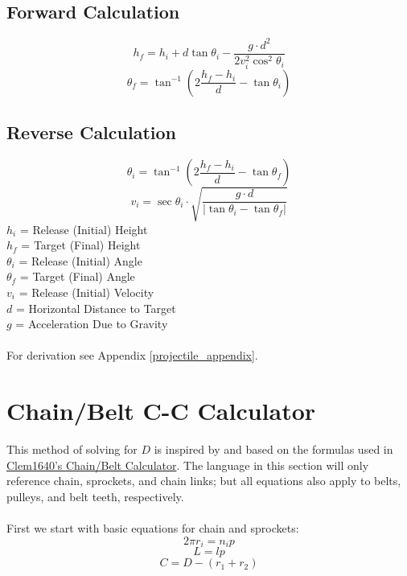 \documentclass[11pt,a4paper,titlepage]{article}
\begin{document}
	\subsection{Forward Calculation}
	\begin{equation} \label{proj_final_height}
		h_f = h_i + d \tan \theta_i - \frac{g \cdot d^2}{2 v_i^2 \cos^2 \theta_i}
	\end{equation}
	\begin{equation} \label{proj_final_angle}
		\theta_f = \tan^{-1} \left( 2 \frac{h_f - h_i}{d} - \tan \theta_i \right)
	\end{equation}
	
	\subsection{Reverse Calculation}
	\begin{equation} \label{proj_init_angle}
		\theta_i = \tan^{-1} \left( 2 \frac{h_f - h_i}{d} - \tan \theta_f \right)
	\end{equation}
	\begin{equation} \label{proj_init_vel}
		v_i = \sec \theta_i \cdot \sqrt{\frac{g \cdot d}{\left| \tan \theta_i - \tan \theta_f \right|}}
	\end{equation}
	$h_i$ = Release (Initial) Height \\
	$h_f$ = Target (Final) Height \\
	$\theta_i$ = Release (Initial) Angle \\
	$\theta_f$ = Target (Final) Angle \\
	$v_i$ = Release	(Initial) Velocity \\
	$d$ = Horizontal Distance to Target \\
	$g$ = Acceleration Due to Gravity\\ \\
	For derivation see Appendix \ref{projectile_appendix}.
	
	\bigskip
	\section{Chain/Belt C-C Calculator}
	This method of solving for $D$ is inspired by and based on the formulas used in \href{https://www.chiefdelphi.com/t/paper-chain-belt-calculator/168971}{Clem1640's Chain/Belt Calculator}. The language in this section will only reference chain, sprockets, and chain links; but all equations also apply to belts, pulleys, and belt teeth, respectively. \\ \\		
	First we start with basic equations for chain and sprockets:
	\begin{equation}
		2 \pi r_i = n_i p
	\end{equation}
	\begin{equation}
		L = l p
	\end{equation}
	\begin{equation}
		C = D - (r_1 + r_2)
	\end{equation}
	
\end{document}
